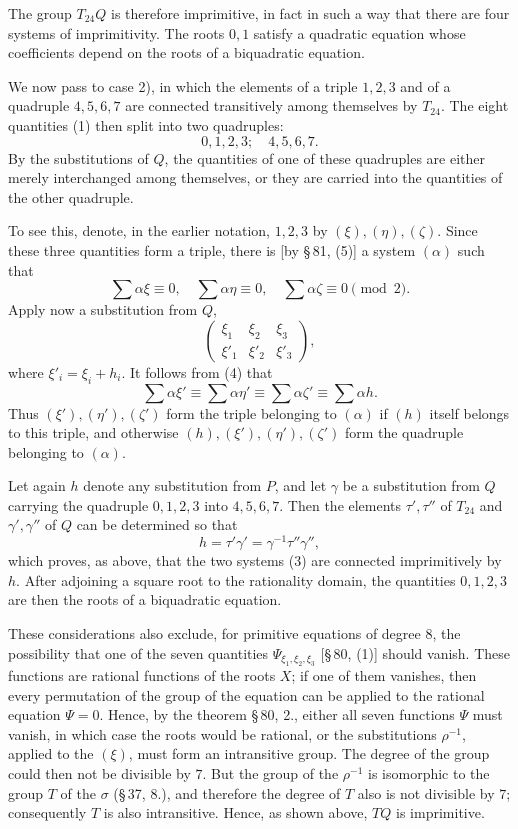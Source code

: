 \documentclass[11pt]{article}
\begin{document}
The group $T_{24}Q$ is therefore imprimitive, in fact in such a way that there are four systems of imprimitivity. The roots $0,1$ satisfy a quadratic equation whose coefficients depend on the roots of a biquadratic equation.

We now pass to case 2), in which the elements of a triple $1,2,3$ and of a quadruple $4,5,6,7$ are connected transitively among themselves by $T_{24}$. The eight quantities (1) then split into two quadruples:
\begin{equation}
 0,1,2,3;\quad 4,5,6,7.
 \tag{3}
\end{equation}
By the substitutions of $Q$, the quantities of one of these quadruples are either merely interchanged among themselves, or they are carried into the quantities of the other quadruple.

To see this, denote, in the earlier notation, $1,2,3$ by $(\xi),(\eta),(\zeta)$. Since these three quantities form a triple, there is [by \S\,81, (5)] a system $(\alpha)$ such that
\begin{equation}
 \sum\alpha\xi\equiv0,
 \quad \sum\alpha\eta\equiv0,
 \quad \sum\alpha\zeta\equiv0\pmod2.
 \tag{4}
\end{equation}
Apply now a substitution from $Q$,
\[
 \begin{pmatrix}
  \xi_1&\xi_2&\xi_3\\
  \xi'_1&\xi'_2&\xi'_3
 \end{pmatrix},
\]
where $\xi'_i=\xi_i+h_i$. It follows from (4) that
\[
 \sum\alpha\xi'\equiv\sum\alpha\eta'\equiv\sum\alpha\zeta'\equiv\sum\alpha h.
\]
Thus $(\xi'),(\eta'),(\zeta')$ form the triple belonging to $(\alpha)$ if $(h)$ itself belongs to this triple, and otherwise $(h),(\xi'),(\eta'),(\zeta')$ form the quadruple belonging to $(\alpha)$.

Let again $h$ denote any substitution from $P$, and let $\gamma$ be a substitution from $Q$ carrying the quadruple $0,1,2,3$ into $4,5,6,7$. Then the elements $\tau',\tau''$ of $T_{24}$ and $\gamma',\gamma''$ of $Q$ can be determined so that
\[
 h=\tau'\gamma'=\gamma^{-1}\tau''\gamma'',
\]
which proves, as above, that the two systems (3) are connected imprimitively by $h$. After adjoining a square root to the rationality domain, the quantities $0,1,2,3$ are then the roots of a biquadratic equation.

These considerations also exclude, for primitive equations of degree $8$, the possibility that one of the seven quantities $\Psi_{\xi_1,\xi_2,\xi_3}$ [\S\,80, (1)] should vanish. These functions are rational functions of the roots $X$; if one of them vanishes, then every permutation of the group of the equation can be applied to the rational equation $\Psi=0$. Hence, by the theorem \S\,80, 2., either all seven functions $\Psi$ must vanish, in which case the roots would be rational, or the substitutions $\rho^{-1}$, applied to the $(\xi)$, must form an intransitive group. The degree of the group could then not be divisible by $7$. But the group of the $\rho^{-1}$ is isomorphic to the group $T$ of the $\sigma$ (\S\,37, 8.), and therefore the degree of $T$ also is not divisible by $7$; consequently $T$ is also intransitive. Hence, as shown above, $TQ$ is imprimitive.
\end{document}
